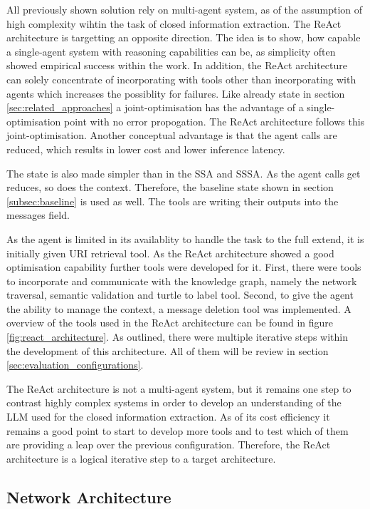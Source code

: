 \documentclass[a4paper,oneside,bibliography=totoc]{scrbook}
\begin{document}
All previously shown solution rely on multi-agent system, as of the assumption of high complexity wihtin the task of closed information extraction. The ReAct architecture is targetting an opposite direction. The idea is to show, how capable a single-agent system with reasoning capabilities can be, as simplicity often showed empirical success within the work. In addition, the ReAct architecture can solely concentrate of incorporating with tools other than incorporating with agents which increases the possiblity for failures. Like already state in section \ref{sec:related_approaches} a joint-optimisation has the advantage of a single-optimisation point with no error propogation. The ReAct architecture follows this joint-optimisation. Another conceptual advantage is that the agent calls are reduced, which results in lower cost and lower inference latency.

The state is also made simpler than in the \ac{SSA} and \ac{SSSA}. As the agent calls get reduces, so does the context. Therefore, the baseline state shown in section \ref{subsec:baseline} is used as well. The tools are writing their outputs into the messages field.

As the agent is limited in its availablity to handle the task to the full extend, it is initially given URI retrieval tool. As the ReAct architecture showed a good optimisation capability further tools were developed for it. First, there were tools to incorporate and communicate with the knowledge graph, namely the network traversal, semantic validation and turtle to label tool. Second, to give the agent the ability to manage the context, a message deletion tool was implemented. A overview of the tools used in the ReAct architecture can be found in figure \ref{fig:react_architecture}. As outlined, there were multiple iterative steps within the development of this architecture. All of them will be review in section \ref{sec:evaluation_configurations}.

The ReAct architecture is not a multi-agent system, but it remains one step to contrast highly complex systems in order to develop an understanding of the \ac{LLM} used for the closed information extraction. As of its cost efficiency it remains a good point to start to develop more tools and to test which of them are providing a leap over the previous configuration. Therefore, the ReAct architecture is a logical iterative step to a target architecture.

\subsection{Network Architecture}
\label{subsec:network}
\end{document}
